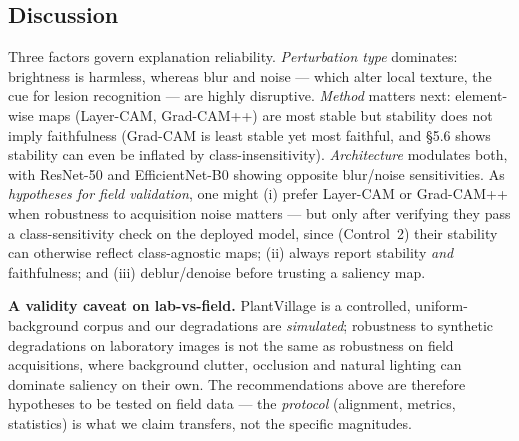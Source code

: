 \documentclass[runningheads]{llncs}
\begin{document}
\begin{table}[t]
\centering
\caption{Fine-tuned EfficientNet-B0: confidence-normalised deletion/insertion AUC on
clean vs.\ perturbed inputs (fraction of the input's own unmasked probability; mean
over four transforms, $n{=}24$). Clean columns read as usual ($\downarrow$/$\uparrow$).
Under perturbation, values $>1$ (a masked input beating the full input) are a
degeneracy signal --- the saliency ordering has become anti-correlated with the
model's evidence, \emph{not} a gain --- so the arrows do not apply to the perturbed
columns.}
\label{tab:faithpert}
\end{table}

\subsection{Discussion}
Three factors govern explanation reliability. \emph{Perturbation type} dominates:
brightness is harmless, whereas blur and noise --- which alter local texture, the
cue for lesion recognition --- are highly disruptive. \emph{Method} matters next:
element-wise maps (Layer-CAM, Grad-CAM++) are most stable but stability does not
imply faithfulness (Grad-CAM is least stable yet most faithful, and \S5.6 shows
stability can even be inflated by class-insensitivity). \emph{Architecture}
modulates both, with ResNet-50 and EfficientNet-B0 showing opposite blur/noise
sensitivities. As \emph{hypotheses for field validation}, one might (i) prefer
Layer-CAM or Grad-CAM++ when robustness to acquisition noise matters --- but only
after verifying they pass a class-sensitivity check on the deployed model, since
(Control~2) their stability can otherwise reflect class-agnostic maps; (ii) always
report stability \emph{and} faithfulness; and (iii) deblur/denoise before trusting
a saliency map.

\smallskip
\noindent\textbf{A validity caveat on lab-vs-field.} PlantVillage is a controlled,
uniform-background corpus and our degradations are \emph{simulated}; robustness to
synthetic degradations on laboratory images is not the same as robustness on field
acquisitions, where background clutter, occlusion and natural lighting can dominate
saliency on their own. The recommendations above are therefore hypotheses to be
tested on field data --- the \emph{protocol} (alignment, metrics, statistics) is
what we claim transfers, not the specific magnitudes.
\end{document}
